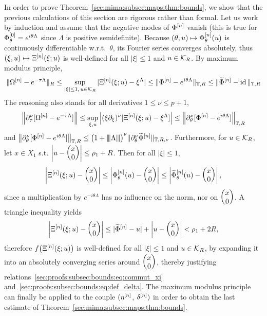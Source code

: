 In order to prove Theorem~\ref{sec:mima:subsec:maps:thm:bounds}, we show
that the previous calculations of this section are rigorous rather than
formal. Let us work by induction and assume that the negative modes of
$\Phi^{[n]}$ vanish (this is true for $\Phi^{[0]}_{\theta} =
e^{i\theta\Lambda}$ since $\Lambda$ is positive semidefinite). Because
$(\theta, u) \mapsto \Phi^{[n]}_{\theta}(u)$ is continuously
differentiable w.r.t.~$\theta$, its Fourier series converges absolutely,
thus $(\xi, u) \mapsto \Xi^{[n]}(\xi;u)$ is well-defined for all $|\xi|
\leq 1$ and $u \in \mathcal{K}_R$. By maximum modulus principle,
\begin{equation*}
  \| \Omega^{[n]} - e^{-\tau\Lambda} \|_{R} 
  \leq \sup_{|\xi| \leq 1,\, u \in \mathcal{K}_R} 
    | \Xi^{[n]}(\xi; u) - \xi^{\Lambda} | 
  \leq \| \Phi^{[n]} - e^{i\theta\Lambda} \|_{\mathbb{T}, R}
  \leq \| \widetilde{\Phi}^{[n]} - \operatorname{id} \|_{\mathbb{T}, R}
\end{equation*}
%
The reasoning also stands for all derivatives $1 \leq \nu \leq p+1$,
\begin{equation*}
  \left\| \partial_{\tau}^{\nu} [\Omega^{[n]} - e^{-\tau\Lambda} ] \right\|
  \leq \sup_{\xi, u} \left| (\xi\partial_{\xi})^{\nu} 
    [ \Xi^{[n]}(\xi ; u) - \xi^{\Lambda} ] \right| 
  \leq \left\| \partial_{\theta}^{\nu} 
    [ \Phi^{[n]} - e^{i\theta\Lambda} ] \right\|_{\mathbb{T}, R}
\end{equation*}
and $\left\| \partial_{\theta}^{\nu} [ \Phi^{[n]} - e^{i\theta\Lambda} ] 
\right\|_{\mathbb{T}, R} \leq \big( 1 + {\left\vert\kern-0.25ex\left\vert\kern-0.25ex\left\vert \Lambda \right\vert\kern-0.25ex\right\vert\kern-0.25ex\right\vert} \big)^{\nu} \| 
\partial_{\theta}^{\nu} \widetilde{\Phi}^{[n]} \|_{\mathbb{T}, R, \nu}$. 
%
Furthermore, for $u \in \mathcal{K}_R$, let $x \in X_1$ s.t. $\left| u -
\begin{pmatrix} x \\ 0 \end{pmatrix} \right| \leq \rho_1 + R$. Then for all $|\xi| \leq 1$, 
\begin{equation*}
  \left| \Xi^{[n]}(\xi ; u) - \begin{pmatrix} x \\ 0 \end{pmatrix} \right| 
  \leq \left| \Phi^{[n]}_{\theta}(u) - \begin{pmatrix} x \\ 0 \end{pmatrix} \right|
  \leq \left| \widetilde{\Phi}^{[n]}_{\theta}(u) - \begin{pmatrix} x \\ 0 \end{pmatrix} \right| ,
\end{equation*}
since a multiplication by $e^{-i\theta\Lambda}$ has no influence on the
norm, nor on $\begin{pmatrix} x \\ 0 \end{pmatrix}$. 
A triangle inequality yields
\begin{equation*}
  \left| \Xi^{[n]}(\xi ; u) - \begin{pmatrix} x \\ 0 \end{pmatrix} \right| 
  \leq | \widetilde{\Phi}^{[n]} - u | + \left| u - \begin{pmatrix} x \\ 0 \end{pmatrix} \right| 
  < \rho_1 + 2R, 
\end{equation*}
therefore $f\big( \Xi^{[n]}(\xi ; u) \big)$ is well-defined for all $|\xi|
\leq 1$ and $u \in \mathcal{K}_R$, by expanding it into an absolutely converging
series around $\begin{pmatrix} x \\ 0 \end{pmatrix}$, thereby justifying
relations~\eqref{sec:proofs:subsec:bounds:eq:commut_xi} 
and~\eqref{sec:proofs:subsec:bounds:eq:def_delta}. 
%
The maximum modulus principle can finally be applied to the couple
$(\eta^{[n]}$, $\delta^{[n]})$ in order to obtain the last estimate of 
Theorem~\ref{sec:mima:subsec:maps:thm:bounds}.
\vspace*{-6pt}
\begin{flushright}
  \qedsymbol
\end{flushright}









